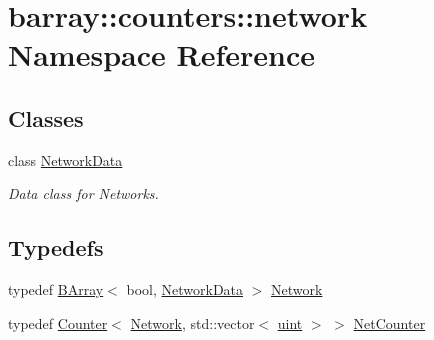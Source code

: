 \hypertarget{namespacebarray_1_1counters_1_1network}{}\section{barray\+:\+:counters\+:\+:network Namespace Reference}
\label{namespacebarray_1_1counters_1_1network}
\subsection*{Classes}
\begin{DoxyCompactItemize}
\item 
class \hyperlink{classbarray_1_1counters_1_1network_1_1_network_data}{Network\+Data}
\begin{DoxyCompactList}\small\item\em Data class for Networks. \end{DoxyCompactList}\end{DoxyCompactItemize}
\subsection*{Typedefs}
\begin{DoxyCompactItemize}
\item 
typedef \hyperlink{classbarray_1_1_b_array}{B\+Array}$<$ bool, \hyperlink{classbarray_1_1counters_1_1network_1_1_network_data}{Network\+Data} $>$ \hyperlink{namespacebarray_1_1counters_1_1network_a29d413c01033d40f81dcbe014b40498c}{Network}
\item 
typedef \hyperlink{classbarray_1_1_counter}{Counter}$<$ \hyperlink{namespacebarray_1_1counters_1_1network_a29d413c01033d40f81dcbe014b40498c}{Network}, std\+::vector$<$ \hyperlink{namespacebarray_af9756a31953db233f80a9cfe1ef31c32}{uint} $>$ $>$ \hyperlink{namespacebarray_1_1counters_1_1network_a0246d66b7032c9d44a10d4fd025e1ac5}{Net\+Counter}
\end{DoxyCompactItemize}
